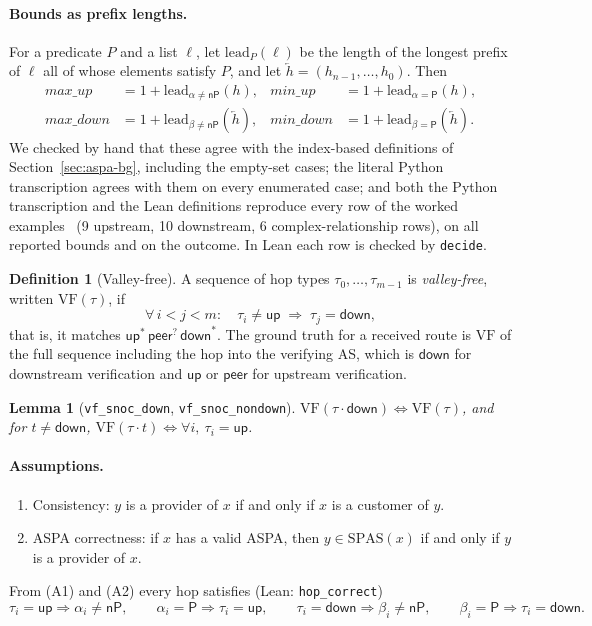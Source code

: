 \documentclass[11pt,a4paper]{article}
\newtheorem{lemma}{Lemma}
\theoremstyle{definition}
\newtheorem{definition}{Definition}
\theoremstyle{remark}
\newcommand{\Pp}{\mathsf{P}}      %
\newcommand{\nP}{\mathsf{nP}}     %
\newcommand{\up}{\mathsf{up}}
\newcommand{\down}{\mathsf{down}}
\newcommand{\peer}{\mathsf{peer}}
\newcommand{\maxup}{\mathit{max\_up}}
\newcommand{\minup}{\mathit{min\_up}}
\newcommand{\maxdown}{\mathit{max\_down}}
\newcommand{\mindown}{\mathit{min\_down}}
\newcommand{\lead}{\mathrm{lead}}
\newcommand{\VF}{\mathrm{VF}}
\newcommand{\lean}[1]{\texttt{#1}}
\begin{document}
\paragraph{Bounds as prefix lengths.}
For a predicate $P$ and a list $\ell$, let $\lead_P(\ell)$ be the length of the longest prefix of $\ell$
all of whose elements satisfy $P$, and let $\overleftarrow{h}=(h_{n-1},\dots,h_0)$. Then
\begin{align*}
  \maxup   &= 1+\lead_{\alpha\neq\nP}(h), & \minup   &= 1+\lead_{\alpha=\Pp}(h),\\
  \maxdown &= 1+\lead_{\beta\neq\nP}(\overleftarrow{h}), & \mindown &= 1+\lead_{\beta=\Pp}(\overleftarrow{h}).
\end{align*}
We checked by hand that these agree with the index-based definitions of Section~\ref{sec:aspa-bg},
including the empty-set cases; the literal Python transcription agrees with them on every enumerated
case; and both the Python transcription and the Lean definitions reproduce every row of the worked
examples~\cite{aspa-examples} (9 upstream, 10 downstream, 6 complex-relationship rows), on all reported
bounds and on the outcome. In Lean each row is checked by \lean{decide}.

\begin{definition}[Valley-free]
A sequence of hop types $\tau_0,\dots,\tau_{m-1}$ is \emph{valley-free}, written $\VF(\tau)$, if
\[
  \forall\, i<j<m:\quad \tau_i\neq\up\;\Longrightarrow\;\tau_j=\down ,
\]
that is, it matches $\up^{*}\,\peer^{?}\,\down^{*}$. The ground truth for a received route is $\VF$ of the
full sequence including the hop into the verifying AS, which is $\down$ for downstream verification and
$\up$ or $\peer$ for upstream verification.
\end{definition}

\begin{lemma}[\lean{vf\_snoc\_down}, \lean{vf\_snoc\_nondown}]
$\VF(\tau\cdot\down)\iff\VF(\tau)$, and for $t\neq\down$, $\VF(\tau\cdot t)\iff\forall i,\ \tau_i=\up$.
\end{lemma}

\paragraph{Assumptions.}
\begin{enumerate}[label=(A\arabic*),nosep]
  \item Consistency: $y$ is a provider of $x$ if and only if $x$ is a customer of $y$.
  \item ASPA correctness: if $x$ has a valid ASPA, then $y\in\mathrm{SPAS}(x)$ if and only if $y$ is a provider of $x$.
\end{enumerate}
From (A1) and (A2) every hop satisfies (Lean: \lean{hop\_correct})
\begin{equation}\label{eq:correct}
  \tau_i=\up\Rightarrow\alpha_i\neq\nP,\qquad
  \alpha_i=\Pp\Rightarrow\tau_i=\up,\qquad
  \tau_i=\down\Rightarrow\beta_i\neq\nP,\qquad
  \beta_i=\Pp\Rightarrow\tau_i=\down .
\end{equation}
\end{document}
